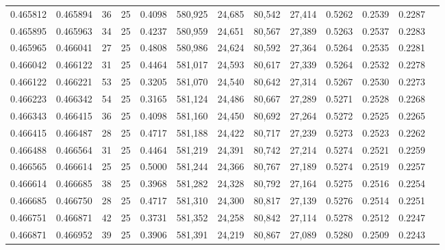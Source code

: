 \begin{tabular}{rrrrrrrrrrrrr}
0.465812 & 0.465894 &    36 &  25 &                                     0.4098 & 580,925 &  24,685 &  80,542 &  27,414 & 0.5262 & 0.2539 & 0.2287 \\
0.465895 & 0.465963 &    34 &  25 &                                     0.4237 & 580,959 &  24,651 &  80,567 &  27,389 & 0.5263 & 0.2537 & 0.2283 \\
0.465965 & 0.466041 &    27 &  25 &                                     0.4808 & 580,986 &  24,624 &  80,592 &  27,364 & 0.5264 & 0.2535 & 0.2281 \\
0.466042 & 0.466122 &    31 &  25 &                                     0.4464 & 581,017 &  24,593 &  80,617 &  27,339 & 0.5264 & 0.2532 & 0.2278 \\
0.466122 & 0.466221 &    53 &  25 &                                     0.3205 & 581,070 &  24,540 &  80,642 &  27,314 & 0.5267 & 0.2530 & 0.2273 \\
0.466223 & 0.466342 &    54 &  25 &                                     0.3165 & 581,124 &  24,486 &  80,667 &  27,289 & 0.5271 & 0.2528 & 0.2268 \\
0.466343 & 0.466415 &    36 &  25 &                                     0.4098 & 581,160 &  24,450 &  80,692 &  27,264 & 0.5272 & 0.2525 & 0.2265 \\
0.466415 & 0.466487 &    28 &  25 &                                     0.4717 & 581,188 &  24,422 &  80,717 &  27,239 & 0.5273 & 0.2523 & 0.2262 \\
0.466488 & 0.466564 &    31 &  25 &                                     0.4464 & 581,219 &  24,391 &  80,742 &  27,214 & 0.5274 & 0.2521 & 0.2259 \\
0.466565 & 0.466614 &    25 &  25 &                                     0.5000 & 581,244 &  24,366 &  80,767 &  27,189 & 0.5274 & 0.2519 & 0.2257 \\
0.466614 & 0.466685 &    38 &  25 &                                     0.3968 & 581,282 &  24,328 &  80,792 &  27,164 & 0.5275 & 0.2516 & 0.2254 \\
0.466685 & 0.466750 &    28 &  25 &                                     0.4717 & 581,310 &  24,300 &  80,817 &  27,139 & 0.5276 & 0.2514 & 0.2251 \\
0.466751 & 0.466871 &    42 &  25 &                                     0.3731 & 581,352 &  24,258 &  80,842 &  27,114 & 0.5278 & 0.2512 & 0.2247 \\
0.466871 & 0.466952 &    39 &  25 &                                     0.3906 & 581,391 &  24,219 &  80,867 &  27,089 & 0.5280 & 0.2509 & 0.2243 \\

\end{tabular}
